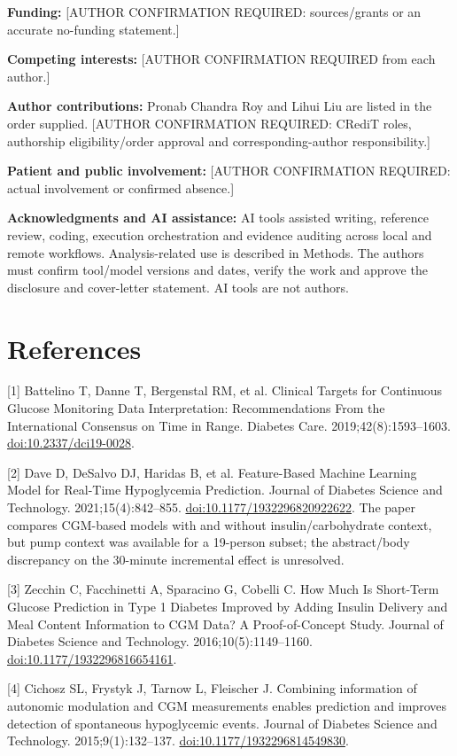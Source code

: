\documentclass[11pt,a4paper]{article}
\begin{document}
\textbf{Funding:} [AUTHOR CONFIRMATION REQUIRED: sources/grants or an accurate no-funding statement.]

\textbf{Competing interests:} [AUTHOR CONFIRMATION REQUIRED from each author.]

\textbf{Author contributions:} Pronab Chandra Roy and Lihui Liu are listed in the order supplied. [AUTHOR CONFIRMATION REQUIRED: CRediT roles, authorship eligibility/order approval and corresponding-author responsibility.]

\textbf{Patient and public involvement:} [AUTHOR CONFIRMATION REQUIRED: actual involvement or confirmed absence.]

\textbf{Acknowledgments and AI assistance:} AI tools assisted writing, reference review, coding, execution orchestration and evidence auditing across local and remote workflows. Analysis-related use is described in Methods. The authors must confirm tool/model versions and dates, verify the work and approve the disclosure and cover-letter statement. AI tools are not authors.

\section*{References}
[1] Battelino T, Danne T, Bergenstal RM, et al. Clinical Targets for Continuous Glucose Monitoring Data Interpretation: Recommendations From the International Consensus on Time in Range. Diabetes Care. 2019;42(8):1593--1603. \href{https://doi.org/10.2337/dci19-0028}{doi:10.2337/dci19-0028}.

[2] Dave D, DeSalvo DJ, Haridas B, et al. Feature-Based Machine Learning Model for Real-Time Hypoglycemia Prediction. Journal of Diabetes Science and Technology. 2021;15(4):842--855. \href{https://doi.org/10.1177/1932296820922622}{doi:10.1177/1932296820922622}. The paper compares CGM-based models with and without insulin/carbohydrate context, but pump context was available for a 19-person subset; the abstract/body discrepancy on the 30-minute incremental effect is unresolved.

[3] Zecchin C, Facchinetti A, Sparacino G, Cobelli C. How Much Is Short-Term Glucose Prediction in Type 1 Diabetes Improved by Adding Insulin Delivery and Meal Content Information to CGM Data? A Proof-of-Concept Study. Journal of Diabetes Science and Technology. 2016;10(5):1149--1160. \href{https://doi.org/10.1177/1932296816654161}{doi:10.1177/1932296816654161}.

[4] Cichosz SL, Frystyk J, Tarnow L, Fleischer J. Combining information of autonomic modulation and CGM measurements enables prediction and improves detection of spontaneous hypoglycemic events. Journal of Diabetes Science and Technology. 2015;9(1):132--137. \href{https://doi.org/10.1177/1932296814549830}{doi:10.1177/1932296814549830}.
\end{document}
